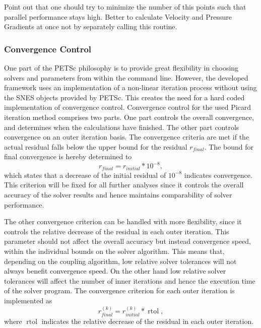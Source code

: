 Point out that one should try to minimize the number of this points such that parallel performance stays high. Better to calculate Velocity and Pressure Gradients at once not by separately calling this routine.

\subsubsection{Convergence Control} 
\label{sec:convergence}
One part of the PETSc philosophy is to provide great flexibility in choosing solvers and parameters from within the command line. However, the developed framework uses an implementation of a non-linear iteration process without using the SNES objects provided by PETSc. This creates the need for a hard coded implementation of convergence control. Convergence control for the used Picard iteration method comprises two parts. One part controls the overall convergence, and determines when the calculations have finished. The other part controls convergence on an outer iteration basis. The convergence criteria are met if the actual residual falls below the upper bound for the residual \(r_{final}\). The bound for final convergence is hereby determined to
\begin{displaymath}
  r_{final} = r_{initial} * 10^{-8},
\end{displaymath}
which states that a decrease of the initial residual of \(10^{-8}\) indicates convergence. This criterion will be fixed for all further analyses since it controls the overall accuracy of the solver results and hence maintains comparability of solver performance. 

The other convergence criterion can be handled with more flexibility, since it controls the relative decrease of the residual in each outer iteration. This parameter should not affect the overall accuracy but instead convergence speed, within the individual bounds on the solver algorithm. This means that, depending on the coupling algorithm, low relative solver tolerances will not always benefit convergence speed. On the other hand low relative solver tolerances will affect the number of inner iterations and hence the execution time of the solver program. The convergence criterion for each outer iteration is implemented as
\begin{displaymath}
  r_{final}^{(k)} = r_{initial}^{(k)} * \operatorname{rtol},
\end{displaymath}
where \(\operatorname{rtol}\) indicates the relative decrease of the residual in each outer iteration. 

